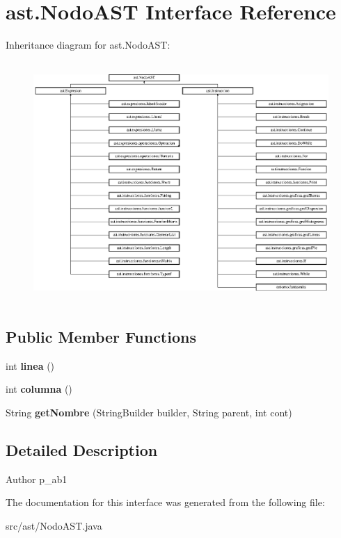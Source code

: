 \hypertarget{interfaceast_1_1_nodo_a_s_t}{}\section{ast.\+Nodo\+A\+ST Interface Reference}
\label{interfaceast_1_1_nodo_a_s_t}
Inheritance diagram for ast.\+Nodo\+A\+ST\+:\begin{figure}[H]
\begin{center}
\leavevmode
\includegraphics[height=9.189190cm]{interfaceast_1_1_nodo_a_s_t}
\end{center}
\end{figure}
\subsection*{Public Member Functions}
\begin{DoxyCompactItemize}
\item 
\mbox{\label{interfaceast_1_1_nodo_a_s_t_a16221a6d574a196e07ac3ae6a4364456}} 
int {\bfseries linea} ()
\item 
\mbox{\label{interfaceast_1_1_nodo_a_s_t_a524e3c279ffcf90d1192645780e606bc}} 
int {\bfseries columna} ()
\item 
\mbox{\label{interfaceast_1_1_nodo_a_s_t_a13a69d91a32b969576752c1da53d103f}} 
String {\bfseries get\+Nombre} (String\+Builder builder, String parent, int cont)
\end{DoxyCompactItemize}


\subsection{Detailed Description}
\begin{DoxyAuthor}{Author}
p\+\_\+ab1 
\end{DoxyAuthor}


The documentation for this interface was generated from the following file\+:\begin{DoxyCompactItemize}
\item 
src/ast/Nodo\+A\+S\+T.\+java\end{DoxyCompactItemize}
